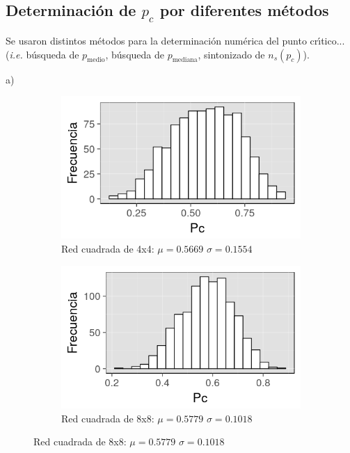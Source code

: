 \documentclass[%
 reprint,
 amsmath,amssymb,
 aps,
spanish]{revtex4-1}
\begin{document}
\subsection{\label{p_c} Determinaci\'on de $p_c$ por diferentes m\'etodos}

Se usaron distintos m\'etodos para la determinaci\'on num\'erica del punto cr\'\i tico...(\emph{i.e.} b\'usqueda de $p_\mathrm{medio}$, b\'usqueda de $p_\mathrm{mediana}$, sintonizado de $n_s(p_c)$).

a)

\begin{figure}[h]
\begin{subfigure}{.25\textwidth}
  \centering
  \includegraphics[width=.9\linewidth]{ej1a/hist4x4}
  \caption{Red cuadrada de 4x4: $\mu=0.5669$ $\sigma=0.1554$}
  \label{fig:1ahist}
\end{subfigure}%
\begin{subfigure}{.25\textwidth}
  \centering
  \includegraphics[width=.9\linewidth]{ej1a/hist8x8}
  \caption{Red cuadrada de 8x8: $\mu=0.5779$ $\sigma=0.1018$}
  \label{fig:1ahist}
\end{subfigure}

\end{figure}
\end{document}
